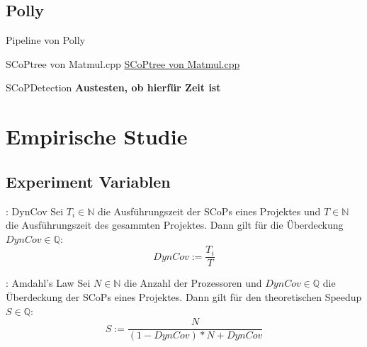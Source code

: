 \documentclass[aspectratio=169, xcolor=dvipsnames]{beamer}
\newcommand{\draftnote}[1]{{\color{red} \textbf{#1}}}
\begin{document}
\subsection{Polly}
\begin{frame}{Pipeline von Polly}
    \begin{figure}[H]
        \centering
        \label{fig:pollyPipeline}
    \end{figure}
\end{frame}
\begin{frame}{SCoPtree von Matmul.cpp}
    \href{run:./gfx/matmulScops.png}{SCoPtree von Matmul.cpp}
\end{frame}
\begin{frame}{SCoPDetection}
    \draftnote{Austesten, ob hierfür Zeit ist}
\end{frame}

\section{Empirische Studie}
\subsection{Experiment Variablen}
\begin{frame}{\subsecname: DynCov}
    Sei \(T_i\in\mathbb{N}\) die Ausführungszeit der SCoPs eines Projektes und \(T\in\mathbb{N}\) die Ausführungszeit des gesammten Projektes. Dann gilt für die Überdeckung \(DynCov\in\mathbb{Q}\):
    \Huge{\[DynCov := \frac{T_i}{T}\]}
\end{frame}
\begin{frame}{\subsecname: Amdahl's Law}
    Sei \(N\in\mathbb{N}\) die Anzahl der Prozessoren und \(DynCov\in\mathbb{Q}\) die Überdeckung der SCoPs eines Projektes. Dann gilt für den theoretischen Speedup \(S\in\mathbb{Q}\):
    \Huge{\[S := \frac{N}{(1-DynCov)*N+DynCov}\]}
\end{frame}
\end{document}
